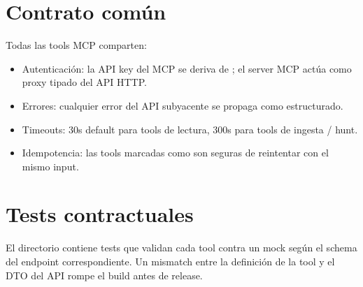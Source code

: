 \section{Contrato común}

Todas las tools MCP comparten:

\begin{itemize}
    \item Autenticación: la API key del MCP se deriva de
    ; el server MCP actúa como proxy
    tipado del API HTTP.
    \item Errores: cualquier error del API subyacente se propaga
    como  estructurado.
    \item Timeouts: 30s default para tools de lectura, 300s para
    tools de ingesta / hunt.
    \item Idempotencia: las tools marcadas como  son
    seguras de reintentar con el mismo input.
\end{itemize}

\section{Tests contractuales}

El directorio  contiene tests que
validan cada tool contra un  mock según el
schema del endpoint correspondiente. Un mismatch entre la definición
de la tool y el DTO del API rompe el build antes de release.
